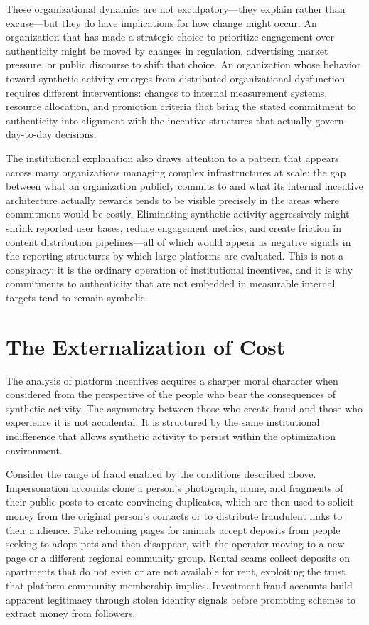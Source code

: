 \documentclass[12pt, a4paper]{article}
\begin{document}
These organizational dynamics are not exculpatory---they explain rather than excuse---but they do have implications for how change might occur. An organization that has made a strategic choice to prioritize engagement over authenticity might be moved by changes in regulation, advertising market pressure, or public discourse to shift that choice. An organization whose behavior toward synthetic activity emerges from distributed organizational dysfunction requires different interventions: changes to internal measurement systems, resource allocation, and promotion criteria that bring the stated commitment to authenticity into alignment with the incentive structures that actually govern day-to-day decisions.

The institutional explanation also draws attention to a pattern that appears across many organizations managing complex infrastructures at scale: the gap between what an organization publicly commits to and what its internal incentive architecture actually rewards tends to be visible precisely in the areas where commitment would be costly. Eliminating synthetic activity aggressively might shrink reported user bases, reduce engagement metrics, and create friction in content distribution pipelines---all of which would appear as negative signals in the reporting structures by which large platforms are evaluated. This is not a conspiracy; it is the ordinary operation of institutional incentives, and it is why commitments to authenticity that are not embedded in measurable internal targets tend to remain symbolic.

\section{The Externalization of Cost}

The analysis of platform incentives acquires a sharper moral character when considered from the perspective of the people who bear the consequences of synthetic activity. The asymmetry between those who create fraud and those who experience it is not accidental. It is structured by the same institutional indifference that allows synthetic activity to persist within the optimization environment.

Consider the range of fraud enabled by the conditions described above. Impersonation accounts clone a person's photograph, name, and fragments of their public posts to create convincing duplicates, which are then used to solicit money from the original person's contacts or to distribute fraudulent links to their audience. Fake rehoming pages for animals accept deposits from people seeking to adopt pets and then disappear, with the operator moving to a new page or a different regional community group. Rental scams collect deposits on apartments that do not exist or are not available for rent, exploiting the trust that platform community membership implies. Investment fraud accounts build apparent legitimacy through stolen identity signals before promoting schemes to extract money from followers.
\end{document}
